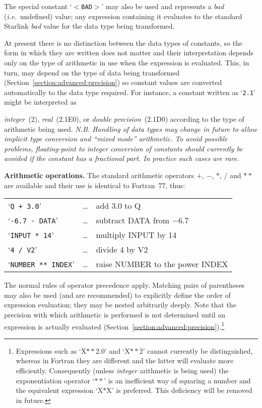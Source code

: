 \documentclass[twoside,nolof,11pt]{starlink}
\providecommand{\name}[1]{\small{#1}}
\begin{document}
The special constant `$<$\verb#BAD#$>$' may also be used and represents a
\emph{bad} (\emph{i.e.}\ undefined) value; any expression containing it
evaluates to the standard Starlink \emph{bad} value for the data type being
transformed.

At present there is no distinction between the data types of constants, so
the form in which they are written does not matter and their interpretation
depends only on the type of arithmetic in use when the expression is
evaluated.
This, in turn, may depend on the type of data being transformed
(Section~\ref{section:advanced:precision}) so constant values are converted
automatically to the data type required.
For instance, a constant written as `\mbox{\texttt{2.1}}' might be interpreted as

\emph{integer}~(2), \emph{real}~(2.1E0), or \emph{double precision}~(2.1D0)
according to the type of arithmetic being used. \emph{N.B. Handling of data types may change in future to allow
  implicit type conversion and ``mixed mode'' arithmetic. To avoid
  possible problems, floating-point to integer conversion of constants
  should currently be avoided if the constant has a fractional part.
  In practice such cases are rare.}


\textbf{Arithmetic operations.}
The standard arithmetic operators $+$, $-$, $*$, $/$ and $**$ are available
and their use is identical to Fortran~77, thus:


\begin{center}
\begin{tabular}{lcl}

`\texttt{Q + 3.0}' & \ldots & add 3.0 to Q\\
`\texttt{-6.7 - DATA}' & \dots & subtract \name{DATA} from $-$6.7\\
`\texttt{INPUT * 14}' & \ldots & multiply \name{INPUT} by 14 \\
`\texttt{4 / V2}' & \ldots & divide 4 by \name{V2}\\
`\texttt{NUMBER ** INDEX}' & \ldots & raise \name{NUMBER} to the power
\name{INDEX}

\end{tabular}
\end{center}


The normal rules of operator precedence apply.
Matching pairs of parentheses may also be used (and are recommended) to
explicitly define the order of expression evaluation; they may be nested
arbitrarily deeply.
Note that the precision with which arithmetic is performed is not determined
until an expression is actually evaluated
(Section~\ref{section:advanced:precision}).\footnote{
Expressions such as `X$**$2.0' and `X$**$2' cannot currently be
distinguished, whereas in Fortran they are different and the latter will
evaluate more efficiently.
Consequently (unless \emph{integer} arithmetic is being used) the
exponentiation operator `$**$' is an inefficient way of squaring a
number and the equivalent expression `X$*$X' is preferred.
This deficiency will be removed in future.}
\end{document}
